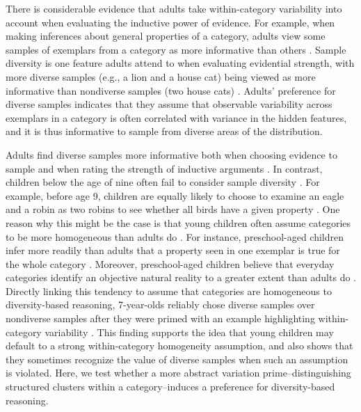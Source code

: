 \documentclass[10pt,letterpaper]{article}
\begin{document}
There is considerable evidence that adults take within-category variability into account when evaluating the inductive power of evidence. 
For example, when making inferences about general properties of a category, adults view some samples of exemplars from a category as more informative than others \cite{Rips:1975,Osherson:1990}.
Sample diversity is one feature adults attend to when evaluating evidential strength, with more diverse samples (e.g., a lion and a house cat) being viewed as more informative than nondiverse samples (two house cats) \cite{Heit:2000}. 
Adults' preference for diverse samples indicates that they assume that observable variability across exemplars in a category is often correlated with variance in the hidden features, and it is thus informative to sample from diverse areas of the distribution. 

Adults find diverse samples more informative both when choosing evidence to sample \cite{Kim:2003,Lopez:1995,RhodesBrickman:2008,Rhodes:2008} and when rating the strength of inductive arguments \cite{Osherson:1990}.
In contrast, children below the age of nine often fail to consider sample diversity \cite{Gutheil:1997,Rhodes:2008,RhodesBrickman:2008}. 
For example, before age 9, children are equally likely to choose to examine an eagle and a robin as two robins to see whether all birds have a given property \cite{RhodesBrickman:2008,Rhodes:2008}. One reason why this might be the case is that young children often assume categories to be more homogeneous than adults do \cite{Gelman:2003}. For instance, preschool-aged children infer more readily than adults that a property seen in one exemplar is true for the whole category \cite{Rhodes:2008}.
Moreover, preschool-aged children believe that everyday categories identify an objective natural reality to a greater extent than adults do \cite{Kalish:1998}. Directly linking this tendency to assume that categories are homogeneous to diversity-based reasoning, 7-year-olds reliably chose diverse samples over nondiverse samples after they were primed with an example highlighting within-category variability \cite{Rhodes:2010}. 
This finding supports the idea that young children may default to a strong within-category homogeneity assumption, and also shows that they sometimes recognize the value of diverse samples when such an assumption is violated. 
Here, we test whether a more abstract variation prime--distinguishing structured clusters within a category--induces a preference for diversity-based reasoning. 
\end{document}
